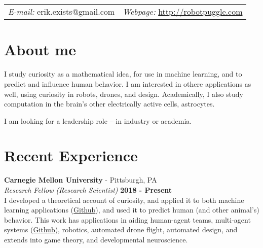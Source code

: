 \documentclass[margin,line]{res}
\begin{document}
\newcommand{\link}[1]{\texttt{#1}}
\providecommand{\tightlist}{%
    \setlength{\itemsep}{0pt}\setlength{\parskip}{0pt}}



\begin{resume}
\section{\sc }
\vspace{.05in}

\begin{tabular}{@{}p{2in}p{4in}}
{\it E-mail:}  erik.exists@gmail.com   & {\it Webpage:} \href{http://robotpuggle.com}{http://robotpuggle.com} \\
\end{tabular}

\vspace{.2cm}
\section{\sc About me}
I study curiosity as a mathematical idea, for use in machine learning, and to predict and influence human behavior. I am interested in othere applications as well, using curiosity in robots, drones, and design. Academically, I also study computation in the brain’s other electrically active cells, astrocytes. 

\vspace{-.3cm}
I am looking for a leadership role -- in industry or academia.

\section{\sc Recent Experience}
\vspace{-.2cm}
{\bf Carnegie Mellon University} - Pittsburgh, PA \\
{\em Research Fellow (Research Scientist)} \hfill {\bf 2018 - Present}\\
I developed a theoretical account of curiosity, and applied it to both machine learning applications (\href{https://github.com/CoAxLab/infomercial}{Github}), and used it to predict human (and other animal's) behavior. This work has applications in aiding human-agent teams, multi-agent systems (\href{https://github.com/parenthetical-e/parkid}{Github}), robotics, automated drone flight, automated design, and extends into game theory, and developmental neuroscience.


\end{resume}
\end{document}
